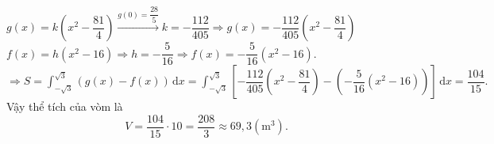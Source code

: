 \begin{bt}
{		$g(x)=k\left(x^2-\dfrac{81}{4}\right) \xrightarrow{g(0)=\dfrac{28}{5}} k=-\dfrac{112}{405} \Rightarrow  g(x)=-\dfrac{112}{405}\left(x^2-\dfrac{81}{4}\right)$\\
		 $f(x)=h(x^2-16) \Rightarrow h=-\dfrac{5}{16} \Rightarrow f(x)=-\dfrac{5}{16}(x^2-16).$\\
		$\Rightarrow S=\displaystyle\int_{-\sqrt{3}}^{\sqrt{3}} \left(g(x)-f(x)\right) \mathrm{\,d}x=\displaystyle\int_{-\sqrt{3}}^{\sqrt{3}}  \left[-\dfrac{112}{405}\left(x^2-\dfrac{81}{4}\right)-\left(-\dfrac{5}{16}(x^2-16)\right)\right] \mathrm{\,d}x=\dfrac{104}{15}.$\\
	Vậy thể tích của vòm là \[V=\dfrac{104}{15} \cdot 10=\dfrac{208}{3} \approx  69,3(\text{m}^3).\]}
\end{bt}

